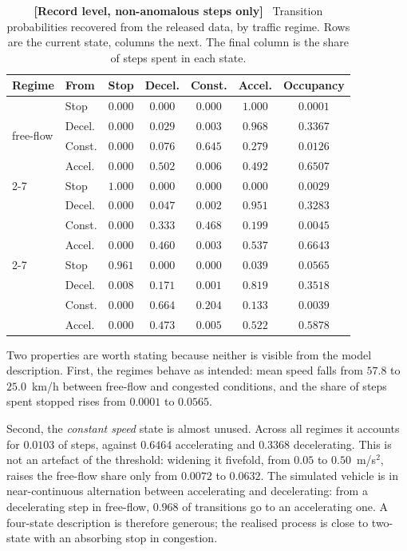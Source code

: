 \documentclass[journal]{IEEEtran}
\begin{document}
\begin{table}[!t]
  \centering
  \caption{\textbf{[Record level, non-anomalous steps only]}~ Transition
  probabilities recovered from the released data, by traffic regime. Rows are
  the current state, columns the next. The final column is the share of steps
  spent in each state.}
  \label{tab:markov}
  \renewcommand{\arraystretch}{1.15}
  \footnotesize
  \begin{tabular}{@{}llccccc@{}}
    \toprule
    \textbf{Regime} & \textbf{From} & \textbf{Stop} & \textbf{Decel.}
    & \textbf{Const.} & \textbf{Accel.} & \textbf{Occupancy} \\ \midrule
    \multirow{4}{*}{free-\allowbreak flow} & Stop & $0.000$ & $0.000$ & $0.000$ & $1.000$ & $0.0001$ \\
     & Decel. & $0.000$ & $0.029$ & $0.003$ & $0.968$ & $0.3367$ \\
     & Const. & $0.000$ & $0.076$ & $0.645$ & $0.279$ & $0.0126$ \\
     & Accel. & $0.000$ & $0.502$ & $0.006$ & $0.492$ & $0.6507$ \\
    \cmidrule(l){2-7}
    \multirow{4}{*}{transition} & Stop & $1.000$ & $0.000$ & $0.000$ & $0.000$ & $0.0029$ \\
     & Decel. & $0.000$ & $0.047$ & $0.002$ & $0.951$ & $0.3283$ \\
     & Const. & $0.000$ & $0.333$ & $0.468$ & $0.199$ & $0.0045$ \\
     & Accel. & $0.000$ & $0.460$ & $0.003$ & $0.537$ & $0.6643$ \\
    \cmidrule(l){2-7}
    \multirow{4}{*}{congested} & Stop & $0.961$ & $0.000$ & $0.000$ & $0.039$ & $0.0565$ \\
     & Decel. & $0.008$ & $0.171$ & $0.001$ & $0.819$ & $0.3518$ \\
     & Const. & $0.000$ & $0.664$ & $0.204$ & $0.133$ & $0.0039$ \\
     & Accel. & $0.000$ & $0.473$ & $0.005$ & $0.522$ & $0.5878$ \\
    \bottomrule
  \end{tabular}
\end{table}

Two properties are worth stating because neither is visible from the model
description. First, the regimes behave as intended: mean speed falls from
$57.8$ to
$25.0$~km/h between free-flow and congested conditions, and
the share of steps spent stopped rises from
$0.0001$ to
$0.0565$.

Second, the \emph{constant speed} state is almost unused. Across all regimes
it accounts for $0.0103$ of steps, against
$0.6464$ accelerating and $0.3368$ decelerating. This is not an
artefact of the threshold: widening it fivefold, from $0.05$ to
$0.50$~m/s$^2$, raises the free-flow share only from
$0.0072$ to $0.0632$. The simulated vehicle is
in near-continuous alternation between accelerating and decelerating: from a
decelerating step in free-flow, $0.968$ of transitions go to an
accelerating one. A four-state description is therefore generous; the
realised process is close to two-state with an absorbing stop in congestion.
\end{document}
